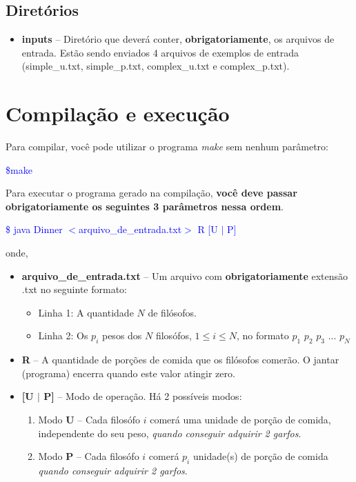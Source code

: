 \documentclass[11pt]{article}
\begin{document}
\subsection{Diretórios}
\begin{itemize}
	\item \textbf{inputs} -- Diretório que deverá conter, \textbf{obrigatoriamente}, os arquivos de entrada. Estão sendo enviados 4 arquivos de exemplos de entrada (simple\_u.txt, simple\_p.txt, complex\_u.txt e complex\_p.txt). 
\end{itemize}



\section{Compilação e execução}
Para compilar, você pode utilizar o programa \textit{make} sem nenhum parâmetro:

\begin{flushleft}
\textcolor{blue}{\$make}
\end{flushleft}

\noindent Para executar o programa gerado na compilação, \textbf{você deve passar obrigatoriamente os seguintes 3 parâmetros nessa ordem}.

\begin{flushleft}
\textcolor{blue}{\$ java Dinner $<$arquivo\_de\_entrada.txt$>$ R [U $|$ P]}

onde, 
\end{flushleft}
\begin{itemize}
\item \textbf{arquivo\_de\_entrada.txt} -- Um arquivo com \textbf{obrigatoriamente} extensão .txt no seguinte formato:
\begin{itemize}
	\item Linha 1: A quantidade $N$ de filósofos.
	\item Linha 2: Os $p_i$ pesos dos $N$ filosófos, $1 \leq i \leq N$, no formato $p_1$ $p_2$ $p_3$ ... $p_N$ 
\end{itemize} 
\item \textbf{R} -- A quantidade de porções de comida que os filósofos comerão. O jantar (programa) encerra quando este valor atingir zero.
\item \textbf{[U $|$ P]} -- Modo de operação. Há 2 possíveis modos:
\begin{enumerate}
	\item Modo \textbf{U} -- Cada filosófo $i$ comerá uma unidade de porção de comida, independente do seu peso, \textit{quando conseguir adquirir 2 garfos}.
	\item Modo \textbf{P} -- Cada filosófo $i$ comerá $p_i$ unidade(s) de porção de comida \textit{quando conseguir adquirir 2 garfos}.
\end{enumerate}
\end{itemize}
\end{document}
